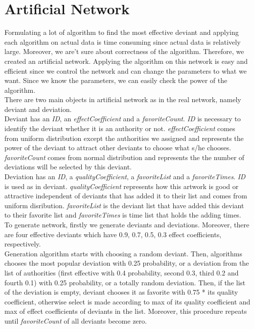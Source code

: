 \documentclass[12pt,a4paper]{report}
\begin{document}
\section{Artificial Network}

	Formulating a lot of algorithm to find the most effective deviant and applying each algorithm on actual data is time consuming since actual data is relatively large. Moreover, we are't sure about correctness of the algorithm. Therefore, we created an artificial network. Applying the algorithm on this network is easy and efficient since we control the network and can change the parameters to what we want. Since we know the parameters, we can easily check the power of the algorithm. \\

	There are two main objects in artificial network as in the real network, namely deviant and deviation. \\

	Deviant has an \emph{ID}, an \emph{effectCoefficient} and a \emph{favoriteCount}. \emph{ID} is necessary to identify the deviant whether it is an authority or not. \emph{effectCoefficient} comes from uniform distribution except the authorities we assigned and represents the power of the deviant to attract other deviants to choose what s/he chooses. \emph{favoriteCount} comes from normal distribution and represents the the number of deviations will be selected by this deviant. \\

	Deviation has an \emph{ID}, a \emph{qualityCoefficient}, a \emph{favoriteList} and a \emph{favoriteTimes}. \emph{ID} is used as in deviant. \emph{qualityCoefficient} represents how this artwork is good or attractive independent of deviants that has added it to their list and comes from uniform disribution. \emph{favoriteList} is the deviant list that have added this deviant to their favorite list and \emph{favoriteTimes} is time list that holds the adding times. \\

          To generate network, firstly we generate deviants and deviations. Moreover, there are four effective deviants which have 0.9, 0.7, 0.5, 0.3 effect coefficients, respectively. \\

	Generation algorithm starts with choosing a random deviant. Then, algorithms chooses the most popular deviation with 0.25 probability, or a deviation from the list of authorities (first effective with 0.4 probability, second 0.3, third 0.2 and fourth 0.1) with 0.25 probability, or a totally random deviation. Then, if the list of the deviation is empty, deviant chooses it as favorite with 0.75 * its quality coefficient,  otherwise select is made according to max of its quality coefficient and max of effect coefficients of deviants in the list. Moreover, this procedure repeats until \emph{favoriteCount} of all deviants become zero.
\end{document}
